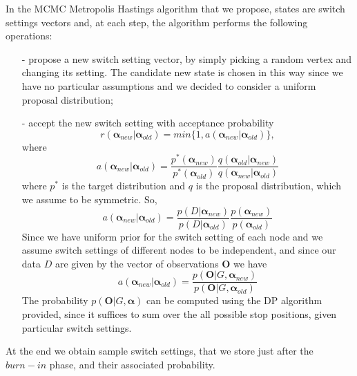 \documentclass[]{article}
\begin{document}
In the MCMC Metropolis Hastings algorithm that we propose, states are switch settings vectors and, at each step, the algorithm performs the following operations:
\begin{enumerate}
	\item[-] propose a new switch setting vector, by simply picking a random vertex and changing its setting. The candidate new state is chosen in this way since we have no particular assumptions and we decided to consider a uniform proposal distribution;
	\item[-] accept the new switch setting with acceptance probability 
	$$
	r(\mathbf{\alpha}_{new}|\mathbf{\alpha}_{old}) = min\{1, a(\mathbf{\alpha}_{new}|\mathbf{\alpha}_{old})\},
	$$
	where
	$$
	a(\mathbf{\alpha}_{new}|\mathbf{\alpha}_{old}) = \frac{p^*(\mathbf{\alpha}_{new})}{p^*(\mathbf{\alpha}_{old})}\frac{q(\mathbf{\alpha}_{old}|\mathbf{\alpha}_{new})}{q(\mathbf{\alpha}_{new}|\mathbf{\alpha}_{old})} 
	$$
	where $p^*$ is the target distribution and $q$ is the proposal distribution, which we assume to be symmetric. So,
	$$
	a(\mathbf{\alpha}_{new}|\mathbf{\alpha}_{old}) = \frac{p(D|\mathbf{\alpha}_{new})}{p(D|\mathbf{\alpha}_{old})} \frac{p(\mathbf{\alpha}_{new})}{p(\mathbf{\alpha}_{old})}
	$$
	Since we have uniform prior for the switch setting of each node and we assume switch settings of different nodes to be independent, and since our data $D$ are given by the vector of observations $\mathbf{O}$ we have
	$$
	a(\mathbf{\alpha}_{new}|\mathbf{\alpha}_{old}) = \frac{p(\mathbf{O}|G,\mathbf{\alpha}_{new})}{p(\mathbf{O}|G,\mathbf{\alpha}_{old})}
	$$
	The probability $p(\mathbf{O}|G,\mathbf{\alpha})$ can be computed using the DP algorithm provided, since it suffices to sum over the all possible stop positions, given particular switch settings. 
\end{enumerate}
At the end we obtain sample switch settings, that we store just after the $burn-in$ phase, and their associated probability.
\end{document}

